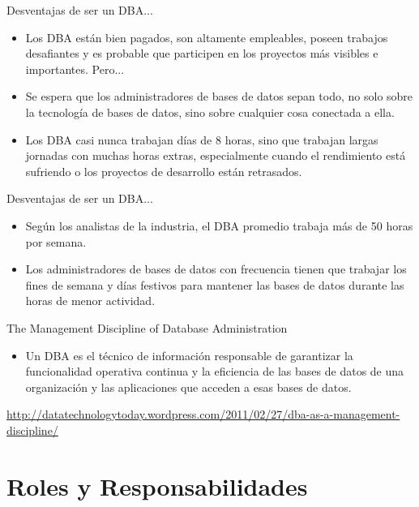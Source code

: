 \documentclass{beamer}
\newcommand{\toRight}[1]{
    \begin{FlushRight}
        {\tiny #1}
    \end{FlushRight}
}
\begin{document}
\begin{frame}{Desventajas de ser un DBA...}
    \begin{itemize}
        \item Los DBA están bien pagados, son altamente empleables, poseen trabajos desafiantes y es probable que participen en los proyectos más visibles e importantes. Pero...
        \item Se espera que los administradores de bases de datos sepan todo, no solo sobre la tecnología de bases de datos, sino sobre cualquier cosa conectada a ella. 
        \item Los DBA casi nunca trabajan días de 8 horas, sino que trabajan largas jornadas con muchas horas extras, especialmente cuando el rendimiento está sufriendo o los proyectos de desarrollo están retrasados. 
    \end{itemize}
\end{frame}


\begin{frame}{Desventajas de ser un DBA...}
    \begin{itemize}
        \item Según los analistas de la industria, el DBA promedio trabaja más de 50 horas por semana.
        \item Los administradores de bases de datos con frecuencia tienen que trabajar los fines de semana y días festivos para mantener las bases de datos durante las horas de menor actividad.
    \end{itemize}
\end{frame}

\begin{frame}{The Management Discipline of Database Administration}
    \begin{itemize}
        \item Un DBA es el técnico de información responsable de garantizar la funcionalidad operativa continua y la eficiencia de las bases de datos de una organización y las aplicaciones que acceden a esas bases de datos.
    \end{itemize}
    
    \toRight{\url{http://datatechnologytoday.wordpress.com/2011/02/27/dba-as-a-management-discipline/}}
\end{frame}

\section{Roles y Responsabilidades}
\end{document}
